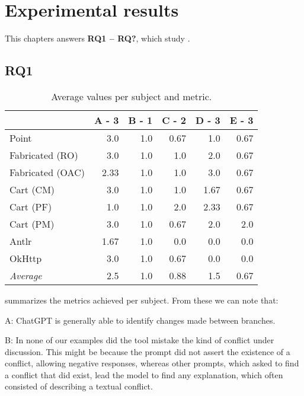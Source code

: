     \chapter{Experimental results}\label{chap:results}

This chapters answers \textbf{RQ1 – RQ?}, which study .

\section{RQ1}\label{sec:results:rq1}

\begin{table}[t]
\centering
\begin{tabular}{@{\extracolsep{\fill}} lrrrrr} \toprule
                 & A - 3 & B - 1 & C - 2 & D - 3 & E - 3 \\
\midrule
Point            & 3.0 & 1.0 & 0.67 & 1.0 & 0.67 \\
Fabricated (RO)  & 3.0 & 1.0 & 1.0 & 2.0 & 0.67 \\
Fabricated (OAC) & 2.33 & 1.0 & 1.0 & 3.0 & 0.67 \\
Cart (CM)        & 3.0 & 1.0 & 1.0 & 1.67 & 0.67 \\
Cart (PF)        & 1.0 & 1.0 & 2.0 & 2.33 & 0.67 \\
Cart (PM)        & 3.0 & 1.0 & 0.67 & 2.0 & 2.0 \\
Antlr            & 1.67 & 1.0 & 0.0 & 0.0 & 0.0 \\
OkHttp           & 3.0 & 1.0 & 0.67 & 0.0 & 0.0 \\
\midrule
\textit{Average}  & 2.5 & 1.0 & 0.88 & 1.5 & 0.67 \\
\bottomrule
\end{tabular}
\caption{Average values per subject and metric.\label{tab:results:rq1}}
\end{table}

 summarizes the metrics achieved per subject. From these we can note that:

A: ChatGPT is generally able to identify changes made between branches.

B: In none of our examples did the tool mistake the kind of conflict under discussion. This might be because the prompt did not assert the existence of a conflict, allowing negative responses, whereas other prompts, which asked to find a conflict that did exist, lead the model to find any explanation, which often consisted of describing a textual conflict.

